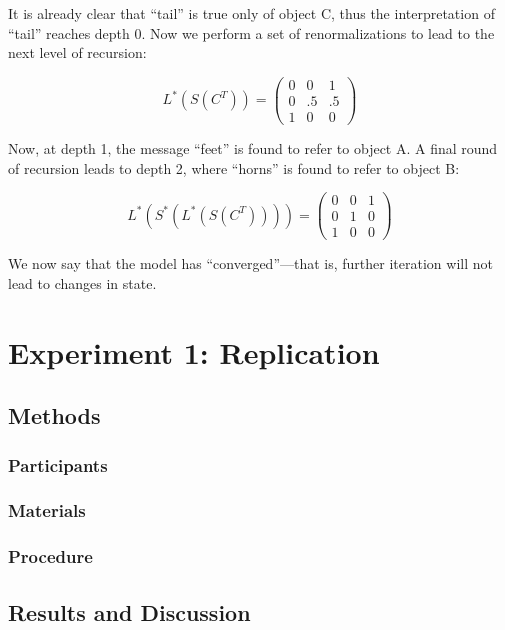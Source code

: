 \documentclass[man,noapacite]{apa2}
\begin{document}
It is already clear that ``tail'' is true only of object C, thus the interpretation of ``tail'' reaches depth 0. Now we perform a set of renormalizations to lead to the next level of recursion:

\begin{equation}
L^*(S(C^T)) = \left(
    \begin{array}{ccc}
      0 & 0 & 1 \\
      0 & .5 & .5\\
      1 & 0 & 0 
    \end{array} 
  \right)
\end{equation}

Now, at depth 1, the message ``feet'' is found to refer to object A. A final round of recursion leads to depth 2, where ``horns'' is found to refer to object B:

\begin{equation}
L^*(S^*(L^*(S(C^T)))) = \left(
    \begin{array}{ccc}
      0 & 0 & 1 \\
      0 & 1 & 0\\
      1 & 0 & 0 
    \end{array} 
  \right)
\end{equation}

We now say that the model has ``converged''---that is, further iteration will not lead to changes in state.



\section{Experiment 1: Replication}

\subsection{Methods}

\subsubsection{Participants}
\subsubsection{Materials}
\subsubsection{Procedure}

\subsection{Results and Discussion}
\end{document}
